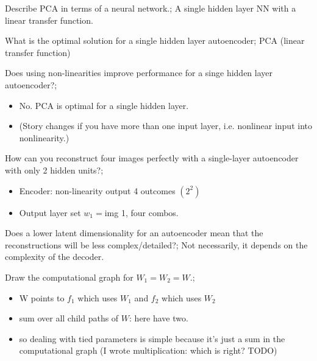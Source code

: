 \documentclass{article}
\begin{document}
Describe PCA in terms of a neural network.; A single hidden layer NN with a linear transfer function.

What is the optimal solution for a single hidden layer autoencoder; PCA (linear transfer function)

Does using non-linearities improve performance for a singe hidden layer autoencoder?; \begin{itemize}
    \item No. PCA is optimal for a single hidden layer. 
    \item (Story changes if you have more than one input layer, i.e. nonlinear input into nonlinearity.)
\end{itemize}

How can you reconstruct four images perfectly with a single-layer autoencoder with only 2 hidden units?; \begin{itemize}
    \item Encoder: non-linearity output 4 outcomes $(2^2)$
    \item Output layer set $w_1=$img 1, four combos.
\end{itemize}

Does a lower latent dimensionality for an autoencoder mean that the reconstructions will be less complex/detailed?; Not necessarily, it depends on the complexity of the decoder.

Draw the computational graph for $W_1 = W_2 = W$.; \begin{itemize}
    \item W points to $f_1$ which uses $W_1$ and $f_2$ which uses $W_2$
    \item sum over all child paths of $W$: here have two.
    \item so dealing with tied parameters is simple because it's just a sum in the computational graph (I wrote multiplication: which is right? TODO)
\end{itemize}

\end{document}
